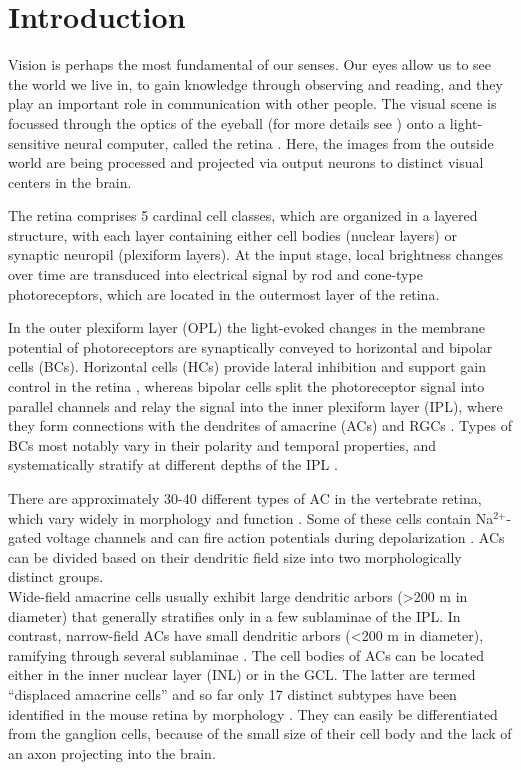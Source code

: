 \chapter{Introduction}

Vision is perhaps the most fundamental of our senses. Our eyes allow us to see the world we live in, to gain knowledge through observing and reading, and they play an important role in communication with other people. The visual scene is focussed through the optics of the eyeball (for more details see \citealp{schaffel06}) onto a light-sensitive neural computer, called the retina \citep{masland01}. Here, the images from the outside world are being processed and projected via output neurons to distinct visual centers in the brain. 

The retina comprises 5 cardinal cell classes, which are organized in a layered structure, with each layer containing either cell bodies (nuclear layers) or synaptic neuropil (plexiform layers). At the input stage, local brightness changes over time are transduced into electrical signal by rod and cone-type photoreceptors, which are located in the outermost layer of the retina. 

In the outer plexiform layer (OPL) the light-evoked changes in the membrane potential of photoreceptors are synaptically conveyed to horizontal and bipolar cells (BCs). Horizontal cells (HCs) provide lateral inhibition and support gain control in the retina \citep{wassle04}, whereas bipolar cells split the photoreceptor signal into parallel channels \citep{wassle04, masland12, baden13} and relay the signal into the inner plexiform layer (IPL), where they form connections with the dendrites of amacrine (ACs) and RGCs \citep{wassle04}. Types of BCs most notably vary in their polarity and temporal properties, and systematically stratify at different depths of the IPL \citep{roska01, baden13}. 

There are approximately 30-40 different types of AC in the vertebrate retina, which vary widely in morphology and function \citep{strettoi96, macneil98}. Some of these cells contain Na$^{\text{2+}}$-gated voltage channels and can fire action potentials during  depolarization \citep{heflin07}. ACs can be divided based on their dendritic field size into two morphologically distinct groups.\\
Wide-field amacrine cells usually exhibit large dendritic arbors (>200 \textmu m in diameter) that generally stratifies only in a few sublaminae of the IPL. In contrast, narrow-field ACs have small dendritic arbors (<200 \textmu m in diameter), ramifying through several sublaminae \citep{roska01}. 
The cell bodies of ACs can be located either in the inner nuclear layer (INL) or in the GCL. The latter are termed “displaced amacrine cells” and so far only 17 distinct subtypes have been identified in the mouse retina by morphology \citep{lin06, sevilla07}. They can easily be differentiated from the ganglion cells, because of the small size of their cell body and the lack of an axon projecting into the brain.  

